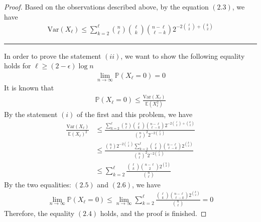 \begin{proof}
  Based on the observations described above, by the equation $(2.3)$, we have
  \begin{align*}
    \text{Var}(X_{\ell}) \leq \sum_{k=2}^{\ell} \binom{n}{\ell} \binom{\ell}{k} \binom{n-\ell}{\ell-k} 2^{-2\binom{\ell}{2} + \binom{k}{2}}
  \end{align*}
  \vspace{5pt}
  \hrule
  In order to prove the statement $(ii)$, we want to show the following equality holds for $\ell \geq (2-\epsilon) \log n$
  \begin{align*}
    \lim_{n \to \infty} \mathbb{P}(X_{\ell} = 0) = 0 \tag{2.4}
  \end{align*}
  It is known that 
  \begin{align*}
    \mathbb{P}(X_{\ell} = 0) \leq \frac{\text{Var}(X_{\ell})}{\mathbb{E}(X_{\ell}^{2})} \tag{2.5}
  \end{align*}
  By the statement $(i)$ of the first and this problem, we have
  \begin{align*}
    \frac{\text{Var}(X_{\ell})}{\mathbb{E}(X_{\ell})^{2}} &\leq \frac{\sum_{k=2}^{\ell} \binom{n}{\ell} \binom{\ell}{k} \binom{n-\ell}{\ell-k} 2^{-2\binom{\ell}{2} + \binom{k}{2}}}{\binom{n}{\ell}^{2} 2^{-2\binom{\ell}{2}}} \\
                                                          &\leq \frac{\binom{n}{\ell} 2^{-2\binom{\ell}{2}} \sum_{k=2}^{\ell} \binom{\ell}{k} \binom{n-\ell}{\ell-k} 2^{ \binom{k}{2}}}{\binom{n}{\ell}^{2} 2^{-2\binom{\ell}{2}}} \\
                                                          &\leq \sum_{k=2}^{\ell} \frac{\binom{\ell}{k} \binom{n-\ell}{2} 2^{\binom{k}{2}}}{\binom{n}{\ell}} \tag{2.6}
  \end{align*}
  By the two equalities: $(2.5)$ and $(2.6)$, we have
  \begin{align*}
  \lim\limits_{n \to \infty} \mathbb{P}(X_{\ell} = 0) \leq \lim\limits_{n \to \infty} \sum\limits_{k=2}^{\ell} \frac{\binom{\ell}{k} \binom{n-\ell}{\ell-k} 2^{\binom{k}{2}}}{\binom{n}{\ell}} = 0
  \end{align*}
  Therefore, the equality $(2.4)$ holds, and the proof is finished.
\end{proof}
